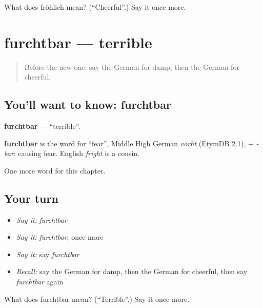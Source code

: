 \begin{tcolorbox}[breakable,colback=teal!4,colframe=teal!35!black,title={Before you move on}]
What does fröhlich mean? (\textquotedblleft{}Cheerful\textquotedblright{}.) Say it once more.
\end{tcolorbox}
\section[furchtbar]{furchtbar — terrible}

\label{lesson:GE-C214-furchtbar}



\begin{quote}
Before the new one: say the German for damp, then the German for cheerful.
\end{quote}

\subsection*{You'll want to know: furchtbar}
\textbf{furchtbar} — \textquotedblleft{}terrible\textquotedblright{}.

\begin{cousinweb}
\textbf{furchtbar} is the word for \textquotedblleft{}fear\textquotedblright{}, Middle High German \emph{vorht} (EtymDB 2.1), + \emph{-bar}: causing fear. English \emph{fright} is a cousin.
\end{cousinweb}

\begin{grammarlens}[title={What you've built}]
One more word for this chapter.
\end{grammarlens}

\subsection*{Your turn}
\begin{itemize}
\raggedright
  \item \emph{Say it:} \emph{furchtbar}
  \item \emph{Say it:} \emph{furchtbar}, once more
  \item \emph{Say it:} say \emph{furchtbar}
  \item \emph{Recall:} say the German for damp, then the German for cheerful, then say \emph{furchtbar} again
\end{itemize}

\begin{tcolorbox}[breakable,colback=teal!4,colframe=teal!35!black,title={Before you move on}]
What does furchtbar mean? (\textquotedblleft{}Terrible\textquotedblright{}.) Say it once more.
\end{tcolorbox}
